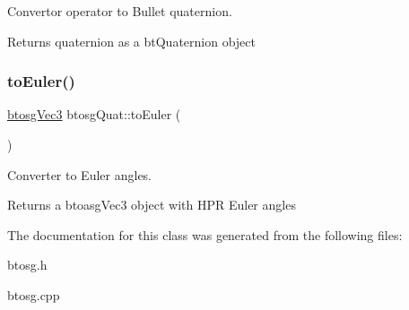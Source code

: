 Convertor operator to Bullet quaternion. 

Returns quaternion as a bt\+Quaternion object \mbox{\label{classbtosgQuat_aeda394d825b449ab87a77820aad1737d}} 
\subsubsection{\texorpdfstring{toEuler()}{toEuler()}}
{\footnotesize\ttfamily \mbox{\hyperlink{classbtosgVec3}{btosg\+Vec3}} btosg\+Quat\+::to\+Euler (\begin{DoxyParamCaption}{ }\end{DoxyParamCaption})}



Converter to Euler angles. 

Returns a btoasg\+Vec3 object with H\+PR Euler angles 

The documentation for this class was generated from the following files\+:\begin{DoxyCompactItemize}
\item 
btosg.\+h\item 
btosg.\+cpp\end{DoxyCompactItemize}
